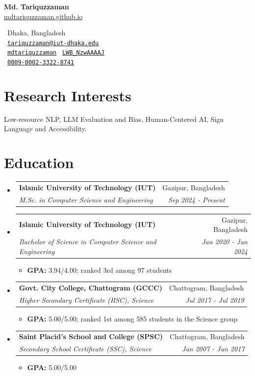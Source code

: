 \documentclass[letterpaper,11pt]{article}
\makeatletter
\newcommand{\cvEntry}[4]{\item
  \begin{tabular*}{\linewidth}{@{}l@{\extracolsep{\fill}}r@{}}
    \textbf{#1} & #2\\
    {\small\textit{#3}} & {\small\textit{#4}}
  \end{tabular*}}
\newenvironment{entries}{\vspace{-1.35pt}\begin{itemize}[leftmargin=14bp,label=\textbullet,itemsep=5.75pt,topsep=0pt,parsep=0pt]}{\end{itemize}}
\newenvironment{details}{\begin{itemize}[leftmargin=24bp,label=$\circ$,itemsep=2pt,topsep=4pt,parsep=0pt]\small}{\end{itemize}}
\makeatother
\begin{document}
\noindent
\begin{minipage}[t]{0.47\textwidth}
  \vspace{6.55bp}
  {\fontsize{20.74pt}{24pt}\selectfont\bfseries Md. Tariquzzaman}\\[3pt]
  \href{https://mdtariquzzaman.github.io}{mdtariquzzaman.github.io}
\end{minipage}\hfill
\begin{minipage}[t]{0.53\textwidth}
  \vspace{0pt}\raggedleft
  \ Dhaka, Bangladesh\\
  \ \href{mailto:tariquzzaman@iut-dhaka.edu}{\texttt{tariquzzaman@iut-dhaka.edu}}\\
  \faGithub\ \href{https://github.com/mdtariquzzaman}{\texttt{mdtariquzzaman}}
  \quad\aiGoogleScholar\ \href{https://scholar.google.com/citations?user=LWB_NzwAAAAJ}{\texttt{LWB\_NzwAAAAJ}}\\
  \aiOrcid\ \href{https://orcid.org/0009-0002-3322-8741}{\texttt{0009-0002-3322-8741}}
\end{minipage}
\vspace{-3.1pt}

\section{Research Interests}
Low-resource NLP, LLM Evaluation and Bias, Human-Centered AI, Sign Language and Accessibility.

\section{Education}
\begin{entries}
  \cvEntry{Islamic University of Technology (IUT)}{Gazipur, Bangladesh}
    {M.Sc. in Computer Science and Engineering}{Sep 2024 - Present}
  \cvEntry{Islamic University of Technology (IUT)}{Gazipur, Bangladesh}
    {Bachelor of Science in Computer Science and Engineering}{Jan 2020 - Jun 2024}
  \begin{details}
    \item \textbf{GPA:} 3.94/4.00; ranked 3rd among 97 students
  \end{details}
  \cvEntry{Govt. City College, Chattogram (GCCC)}{Chattogram, Bangladesh}
    {Higher Secondary Certificate (HSC), Science}{Jul 2017 - Jul 2019}
  \begin{details}
    \item \textbf{GPA:} 5.00/5.00; ranked 1st among 585 students in the Science group
  \end{details}
  \cvEntry{Saint Placid's School and College (SPSC)}{Chattogram, Bangladesh}
    {Secondary School Certificate (SSC), Science}{Jan 2007 - Jun 2017}
  \begin{details}
    \item \textbf{GPA:} 5.00/5.00
  \end{details}
\end{entries}
\end{document}
